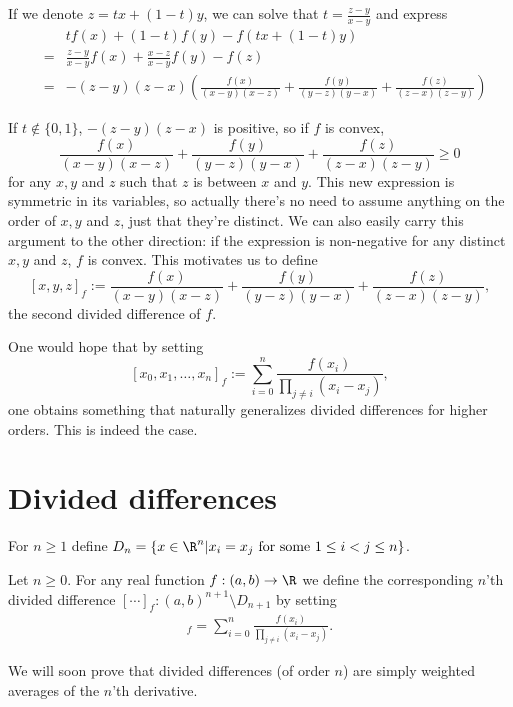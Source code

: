 If we denote $z = t x + (1 - t) y$, we can solve that $t = \frac{z - y}{x - y}$ and express
\begin{eqnarray*}
	&& t f(x) + (1 - t) f(y) - f(t x + (1 - t)y) \\
	&=& \frac{z - y}{x - y} f(x) + \frac{x - z}{x - y} f(y) - f(z) \\
	&=& -(z - y)(z - x) \left(\frac{f(x)}{(x - y)(x - z)} + \frac{f(y)}{(y - z)(y - x)} + \frac{f(z)}{(z - x)(z - y)} \right)
\end{eqnarray*}

If $t \notin \{0, 1\}$, $-(z - y)(z - x)$ is positive, so if $f$ is convex,
\[
	\frac{f(x)}{(x - y)(x - z)} + \frac{f(y)}{(y - z)(y - x)} + \frac{f(z)}{(z - x)(z - y)} \geq 0
\]
for any $x, y$ and $z$ such that $z$ is between $x$ and $y$. This new expression is symmetric in its variables, so actually there's no need to assume anything on the order of $x, y$ and $z$, just that they're distinct. We can also easily carry this argument to the other direction: if the expression is non-negative for any distinct $x, y$ and $z$, $f$ is convex. This motivates us to define
\[
	[x, y, z]_{f} := \frac{f(x)}{(x - y)(x - z)} + \frac{f(y)}{(y - z)(y - x)} + \frac{f(z)}{(z - x)(z - y)},
\]
the second divided difference of $f$.

One would hope that by setting
\[ 
	[x_{0}, x_{1}, \ldots, x_{n}]_{f} := \sum_{i = 0}^{n} \frac{f(x_{i})}{\prod_{j \neq i} (x_{i} - x_{j})},
\]
one obtains something that naturally generalizes divided differences for higher orders. This is indeed the case.

\section{Divided differences}

For $n \geq 1$ define $D_{n} = \{x\in \R^{n} | x_{i} = x_{j} \text{ for some $1 \leq i < j \leq n$}\}$.
\begin{maar}
Let $n \geq 0$. For any real function $f : (a, b) \to \R$ we define the corresponding $n$'th divided difference $[\cdots]_{f} : (a, b)^{n + 1} \setminus D_{n + 1}$ by setting
\begin{align*}
	[x_{0}, x_{1}, \ldots, x_{n}]_{f} = \sum_{i = 0}^{n} \frac{f(x_{i})}{\prod_{j \neq i} (x_{i} - x_{j})}.
\end{align*}
\end{maar}

We will soon prove that divided differences (of order $n$) are simply weighted averages of the $n$'th derivative.


